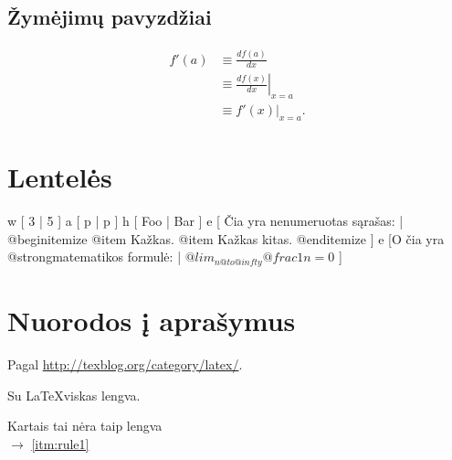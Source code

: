 \subsection{Žymėjimų pavyzdžiai}

\begin{notation}
  \begin{align*}
    f'(a)
    &\equiv \frac{d f(a)}{dx} \\
    &\equiv \left. \frac{d f(x)}{dx} \right|_{x = a} \\
    &\equiv \left. f'(x) \right|_{x = a}.
  \end{align*}
\end{notation}

\section{Lentelės}

\xtable
{
  w [ 3 | 5 ]
  a [ p | p ]
  h [ Foo | Bar ]
  e [ Čia yra nenumeruotas sąrašas: |
  @begin{itemize}
    @item Kažkas.
    @item Kažkas kitas.
  @end{itemize}
  ]
  e [O čia yra @strong{matematikos} formulė: |
  $@lim _{n @to @infty} @frac{1}{n} = 0$
  ]
}

\section{Nuorodos į aprašymus}

Pagal \url{http://texblog.org/category/latex/}.

\begin{description}[style=multiline, labelwidth=2.0cm]
	\item[\namedlabel{itm:rule1}{1 taisyklė}] Su \LaTeX viskas lengva.
	\item[\namedlabel{itm:rule2}{2 taisyklė}] Kartais tai nėra taip lengva\\
		$\to$ \ref{itm:rule1}
\end{description}
